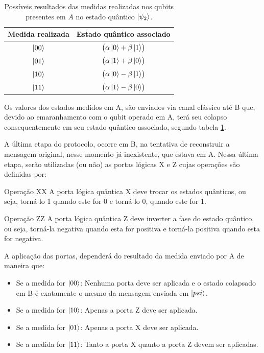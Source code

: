 \begin{table}[ht!]
  \centering
  \caption{Possíveis resultados das medidas realizadas nos qubits presentes em \(A\) no estado quântico $\ket{\psi_2}$.}\label{medidas}
  \begin{tabular}{cc}
    \toprule
    {Medida realizada} & {Estado quântico associado}\\
    \midrule
    $\ket{00}$   & $\bigl( \alpha \ket{0} + \beta \ket{1} \bigr)$\\
    $\ket{01}$   & $\bigl( \alpha \ket{1} + \beta \ket{0} \bigr)$\\
    $\ket{10}$   & $\bigl( \alpha \ket{0} - \beta \ket{1} \bigr)$\\
    $\ket{11}$   & $\bigl( \alpha \ket{1} - \beta \ket{0} \bigr)$\\
    \bottomrule
  \end{tabular}
\end{table}

Os valores dos estados medidos em A, são enviados via canal clássico até B que, devido ao emaranhamento com o qubit operado em A, terá seu colapso consequentemente em seu estado quântico associado, segundo tabela \ref{medidas}.

A última etapa do protocolo, ocorre em B, na tentativa de reconstruir a mensagem original, nesse momento já inexistente, que estava em A. Nessa última etapa, serão utilizadas (ou não) as portas lógicas X e Z cujas operações são definidas por:

\begin{theo}{Operação X}{X}
A porta lógica quântica X deve trocar os estados quânticos, ou seja, torná-lo 1 quando este for 0 e torná-lo 0, quando este for 1.
\end{theo}

\begin{theo}{Operação Z}{Z}
A porta lógica quântica Z deve inverter a fase do estado quântico, ou seja, torná-la negativa quando esta for positiva e torná-la positiva quando esta for negativa.
\end{theo}

A aplicação das portas, dependerá do resultado da medida enviado por A de maneira que:

\begin{itemize}
\item Se a medida for $\ket{00}$: Nenhuma porta deve ser aplicada e o estado colapsado em B é exatamente o mesmo da mensagem enviada em $\ket{psi}$.
\item Se a medida for $\ket{10}$: Apenas a porta Z deve ser aplicada.
\item Se a medida for $\ket{01}$: Apenas a porta X deve ser aplicada.
\item Se a medida for $\ket{11}$: Tanto a porta X quanto a porta Z devem ser aplicadas.
\end{itemize}

